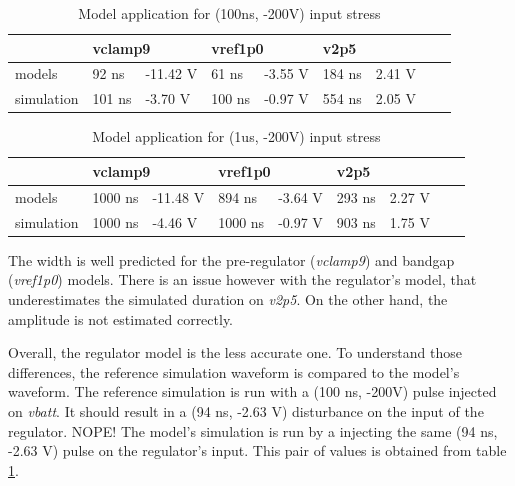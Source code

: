 \begin{table}[!h]
\centering
\begin{tabular}{@{}lllllllll@{}}
           & \multicolumn{2}{l}{vclamp9}           & \multicolumn{2}{l}{vref1p0} & \multicolumn{2}{l}{v2p5} \\
\toprule
models     & 92 ns  & -11.42 V                     & 61 ns       & -3.55 V       & 184 ns                     & 2.41 V     \\
simulation & 101 ns & -3.70 V                      & 100 ns      & -0.97 V       & 554 ns                     & 2.05 V
\end{tabular}
\caption{Model application for (100ns, -200V) input stress}
\label{tab:model-v2-vs-sim-2}
\end{table}

\begin{table}[!h]
\centering
\begin{tabular}{@{}lllllllll@{}}
           & \multicolumn{2}{l}{vclamp9}            & \multicolumn{2}{l}{vref1p0} & \multicolumn{2}{l}{v2p5} \\
\toprule
models     & 1000 ns & -11.48 V                     & 894 ns       & -3.64 V      & 293 ns                      & 2.27 V     \\
simulation & 1000 ns & -4.46 V                      & 1000 ns      & -0.97 V      & 903 ns                      & 1.75 V
\end{tabular}
\caption{Model application for (1us, -200V) input stress}
\label{tab:model-v2-vs-sim-3}
\end{table}

The width is well predicted for the pre-regulator (\textit{vclamp9}) and bandgap (\textit{vref1p0}) models.
There is an issue however with the regulator's model, that underestimates the simulated duration on \textit{v2p5}.
On the other hand, the amplitude is not estimated correctly.

Overall, the regulator model is the less accurate one.
To understand those differences, the reference simulation waveform is compared to the model's waveform.
The reference simulation is run with a (100 ns, -200V) pulse injected on \textit{vbatt}.
It should result in a (94 ns, -2.63 V) disturbance on the input of the regulator. NOPE!
The model's simulation is run by a injecting the same (94 ns, -2.63 V) pulse on the regulator's input.
This pair of values is obtained from table \ref{tab:model-v2-vs-sim-2}.


